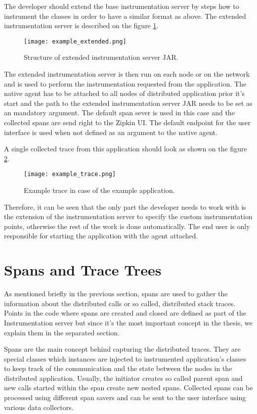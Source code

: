 The developer should extend the base instrumentation server by steps how to instrument the classes  in order to have a similar format as above. The extended instrumentation server is described on the figure \ref{fig:example_extended}.

	\begin{figure}
		\centering
		\texttt{[image: example\_extended.png]}
		\caption{Structure of extended instrumentation server JAR.}
		\label{fig:example_extended}
	\end{figure}

The extended instrumentation server is then run on each node or on the network and is used to perform the instrumentation requested from the application. The native agent has to be attached to all nodes of distributed application prior it's start and the path to the extended instrumentation server JAR needs to be set as an mandatory argument. The default span sever is used in this case and the collected spans are send right to the Zipkin UI. The default endpoint for the user interface is used when not defined as an argument to the native agent. 

A single collected trace from this application should look as shown on the figure \ref{fig:example_trace}.

	\begin{figure}
		\centering
		\texttt{[image: example\_trace.png]}
		\caption{Example trace in case of the example application.}
		\label{fig:example_trace}
	\end{figure}

Therefore, it can be seen that the only part the developer needs to work with is the extension of the instrumentation server to specify the custom instrumentation points, otherwise the rest of the work is done automatically. The end user is only responsible for starting the application with the agent attached.

\section{Spans and Trace Trees}
\label{subsec:spans}
As mentioned briefly in the previous section, spans are used to gather the information about the distributed calls or so called, distributed stack traces. Points in the code where spans are created and closed are defined as part of the Instrumentation server but since it's the most important concept in the thesis, we explain them in the separated section. 

Spans are the main concept behind capturing the distributed traces. They are special classes which instances are injected to instrumented application's classes to keep track of the communication and the state between the nodes in the distributed application. Usually, the initiator creates so called parent span and new calls started within the span create new nested spans. Collected spans can be processed using different span savers and can be sent to the user interface using various data collectors.

